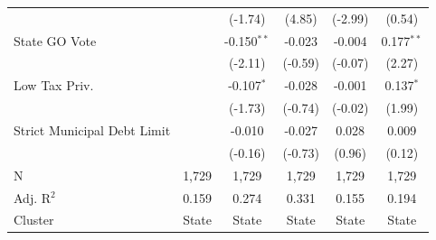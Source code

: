 \begin{tabular*}{\textwidth}{@{\extracolsep{\fill}}lccccc}
                               &                & (-1.74)       & (4.85)        & (-2.99)       & (0.54)\\   
   State GO Vote               &                & -0.150$^{**}$  & -0.023         & -0.004         & 0.177$^{**}$\\   
                               &                & (-2.11)       & (-0.59)       & (-0.07)       & (2.27)\\   
   Low Tax Priv.               &                & -0.107$^{*}$   & -0.028         & -0.001         & 0.137$^{*}$\\   
                               &                & (-1.73)       & (-0.74)       & (-0.02)       & (1.99)\\   
   Strict Municipal Debt Limit &                & -0.010         & -0.027         & 0.028          & 0.009\\   
                               &                & (-0.16)       & (-0.73)       & (0.96)        & (0.12)\\   
   \hline
   N                & 1,729          & 1,729          & 1,729          & 1,729          & 1,729\\  
   Adj. R$^2$              & 0.159          & 0.274          & 0.331          & 0.155          & 0.194\\  
   Cluster              & State & State & State & State & State\\  
   \bottomrule
\end{tabular*}
\par\endgroup
